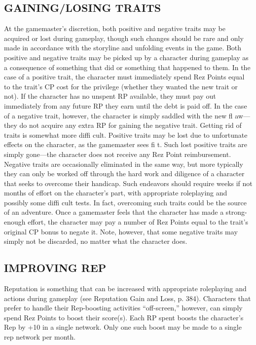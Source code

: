 \subsection{GAINING/LOSING TRAITS}
At the gamemaster’s discretion, both positive and negative traits may be
acquired or lost during gameplay, though such changes should be rare and only
made in accordance with the storyline and unfolding events in the game.  Both
positive and negative traits may be picked up by a character during gameplay as
a consequence of something that did or something that happened to them. In the
case of a positive trait, the character must immediately spend Rez Points equal
to the trait’s CP cost for the privilege (whether they wanted the new trait or
not). If the character has no unspent RP available, they must pay out
immediately from any future RP they earn until the debt is paid off. In the
case of a negative trait, however, the character is simply saddled with the new
fl aw—they do not acquire any extra RP for gaining the negative trait.  Getting
rid of traits is somewhat more diffi cult. Positive traits may be lost due to
unfortunate effects on the character, as the gamemaster sees fi t. Such lost
positive traits are simply gone—the character does not receive any Rez Point
reimbursement. Negative traits are occasionally eliminated in the same way, but
more typically they can only be worked off through the hard work and diligence
of a character that seeks to overcome their handicap. Such endeavors should
require weeks if not months of effort on the character’s part, with appropriate
roleplaying and possibly some diffi cult tests. In fact, overcoming such traits
could be the source of an adventure. Once a gamemaster feels that the character
has made a strong-enough effort, the character may pay a number of Rez Points
equal to the trait’s original CP bonus to negate it. Note, however, that some
negative traits may simply not be discarded, no matter what the character does.

\subsection{IMPROVING REP}
Reputation is something that can be increased with appropriate roleplaying and
actions during gameplay (see Reputation Gain and Loss, p. 384). Characters that
prefer to handle their Rep-boosting activities “off-screen,” however, can
simply spend Rez Points to boost their score(s). Each RP spent boosts the
character’s Rep by +10 in a single network. Only one such boost may be made to
a single rep network per month.

